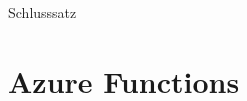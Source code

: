 Schlusssatz

\section{Azure Functions}




\iffalse
Serverless
- Intro
  - What
	- Why
	- Amazn
	- OSS
	- Competitors
- App Service Plan
- Kudu (Jobs, Deploy, Kinds, Scripts)
- Web Jobs SDK
  - Glue code
	- Locally / Dashboard
	- Core Arch
- Functions
  - Script Host Architecture
	- Dynamic Plan
	- Scaling
	- Threading
- Perf Benchmarks
- Pricing Comparison
\fi